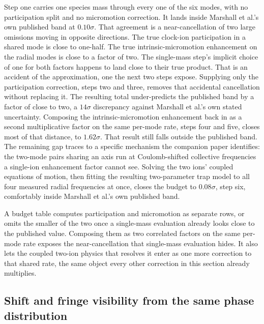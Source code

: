\documentclass[aps,pra,superscriptaddress,groupedaddress,nofootinbib]{revtex4-2}
\begin{document}
Step one carries one species mass through every one of the six
modes, with no participation split and no micromotion correction. It
lands inside Marshall et al.'s own published band at $0.10\sigma$.
That agreement is a near-cancellation of two large omissions moving
in opposite directions. The true clock-ion participation in a shared
mode is close to one-half. The true intrinsic-micromotion
enhancement on the radial modes is close to a factor of two. The
single-mass step's implicit choice of one for both factors happens to
land close to their true product. That is an accident of the
approximation, one the next two steps expose. Supplying only the
participation correction, steps two and three, removes that
accidental cancellation without replacing it. The resulting total
under-predicts the published band by a factor of close to two, a
$14\sigma$ discrepancy against Marshall et al.'s own stated
uncertainty. Composing the intrinsic-micromotion enhancement back in
as a second multiplicative factor on the same per-mode rate, steps
four and five, closes most of that distance, to $1.62\sigma$. That
result still falls outside the published band. The
remaining gap traces to a specific mechanism the companion paper
identifies: the two-mode pairs sharing an axis run at
Coulomb-shifted collective frequencies a single-ion enhancement
factor cannot see. Solving the two ions' coupled equations of
motion, then fitting the resulting two-parameter trap model
to all four measured radial frequencies at once, closes the budget to
$0.08\sigma$, step six, comfortably inside Marshall et al.'s own
published band.

A budget table computes participation and micromotion as separate
rows, or omits the smaller of the two once a single-mass evaluation
already looks close to the published value. Composing them as two
correlated factors on the same per-mode rate exposes the
near-cancellation that single-mass evaluation hides. It also lets the
coupled two-ion physics that resolves it enter as one more correction
to that shared rate, the same object every other correction in this
section already multiplies.

\subsection{Shift and fringe visibility from the same phase distribution}
\label{sec:visibility}
\end{document}

